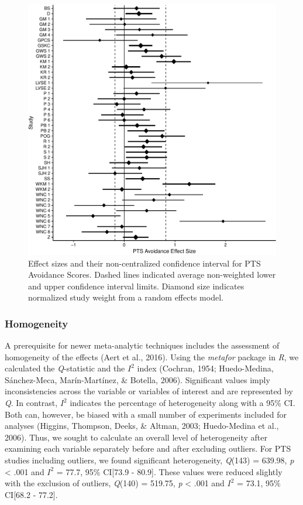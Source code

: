 \documentclass[english,man, mask]{apa6}
\theoremstyle{definition}
\theoremstyle{definition}
\theoremstyle{definition}
\theoremstyle{remark}
\begin{document}
\begin{figure}[htbp]
\centering
\includegraphics{meta_markdown_files/figure-latex/ptspicavoid-1.pdf}
\caption{\label{fig:ptspicavoid}Effect sizes and their non-centralized
confidence interval for PTS Avoidance Scores. Dashed lines indicated
average non-weighted lower and upper confidence interval limits. Diamond
size indicates normalized study weight from a random effects model.}
\end{figure}

\subsubsection{Homogeneity}\label{homogeneity}

A prerequisite for newer meta-analytic techniques includes the
assessment of homogeneity of the effects (Aert et al., 2016). Using the
\emph{metafor} package in \emph{R}, we calculated the \emph{Q}-statistic
and the \(I^2\) index (Cochran, 1954; Huedo-Medina, Sánchez-Meca,
Marín-Martínez, \& Botella, 2006). Significant values imply
inconsistencies across the variable or variables of interest and are
represented by \emph{Q}. In contrast, \(I^2\) indicates the percentage
of heterogeneity along with a 95\% CI. Both can, however, be biased with
a small number of experiments included for analyses (Higgins, Thompson,
Deeks, \& Altman, 2003; Huedo-Medina et al., 2006). Thus, we sought to
calculate an overall level of heterogeneity after examining each
variable separately before and after excluding outliers. For PTS studies
including outliers, we found significant heterogeneity, \emph{Q}(143) =
639.98, \emph{p} \textless{} .001 and \(I^2\) = 77.7, 95\% CI{[}73.9 -
80.9{]}. These values were reduced slightly with the exclusion of
outliers, \emph{Q}(140) = 519.75, \emph{p} \textless{} .001 and \(I^2\)
= 73.1, 95\% CI{[}68.2 - 77.2{]}.
\end{document}
